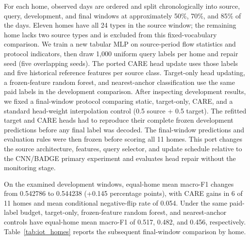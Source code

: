 \documentclass[journal]{IEEEtran}
\newcommand{\ours}{CARE}  %
\begin{document}
For each home, observed days are ordered and split chronologically into source, query, development, and final windows at approximately 50\%, 70\%, and 85\% of the days. Eleven homes have all 24 types in the source window; the remaining home lacks two source types and is excluded from this fixed-vocabulary comparison. We train a new tabular MLP on source-period flow statistics and protocol indicators, then draw 1{,}000 uniform query labels per home and repair seed (five overlapping seeds). The ported \ours{} head update uses those labels and five historical reference features per source class. Target-only head updating, a frozen-feature random forest, and nearest-anchor classification use the same paid labels in the development comparison. After inspecting development results, we fixed a final-window protocol comparing static, target-only, CARE, and a standard head-weight interpolation control (0.5 source + 0.5 target). The refitted target and CARE heads had to reproduce their complete frozen development predictions before any final label was decoded. The final-window predictions and evaluation rules were then frozen before scoring all 11 homes. This port changes the source architecture, features, query selector, and update schedule relative to the CNN/BADGE primary experiment and evaluates head repair without the monitoring stage.

On the examined development windows, equal-home mean macro-F1 changes from 0.542786 to 0.544238 (\mbox{+0.145} percentage points), with CARE gains in 6 of 11 homes and mean conditional negative-flip rate of 0.054. Under the same paid-label budget, target-only, frozen-feature random forest, and nearest-anchor controls have equal-home mean macro-F1 of 0.517, 0.482, and 0.456, respectively. Table~\ref{tab:iot_homes} reports the subsequent final-window comparison by home.
\end{document}
